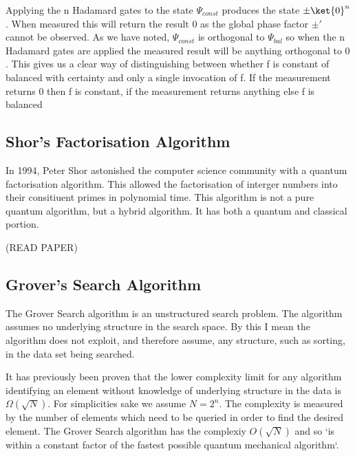\documentclass[authoryearcitations]{UoYCSproject}
\begin{document}
Applying the n Hadamard gates to the state $\Psi_{const}$ produces the state $\pm\ket{0}^n$.
When measured this will return the result $0$ as the global phase factor $\pm'$ cannot be observed.
As we have noted, $\Psi_{const}$ is orthogonal to $\Psi_{bal}$ so when the n Hadamard gates are applied the measured result will be anything orthogonal to $0$.
This gives us a clear way of distinguishing between whether f is constant of balanced with certainty and only a single invocation of f.
If the measurement returns $0$ then f is constant, if the measurement returns anything else f is balanced  

\subsection{Shor's Factorisation Algorithm}
In 1994, Peter Shor astonished the computer science community with a quantum factorisation algorithm.
This allowed the factorisation of interger numbers into their consitiuent primes in polynomial time.
This algorithm is not a pure quantum algorithm, but a hybrid algorithm.
It has both a quantum and classical portion.



(READ PAPER) 

\subsection{Grover's Search Algorithm}	
The Grover Search algorithm\cite{Grover:1996rk} is an unstructured search problem.
The algorithm assumes no underlying structure in the search space.
By this I mean the algorithm does not exploit, and therefore assume, any structure, such as sorting, in the data set being searched.

It has previously been proven\cite{Bennett:1996iu} that the lower complexity limit for any algorithm identifying an element without knowledge of underlying structure in the data is $\Omega(\sqrt{N})$.
For simplicities sake we assume $N=2^n$.
The complexity is measured by the number of elements which need to be queried in order to find the desired element.
The Grover Search algorithm has the complexiy $O(\sqrt{N})$ and so `is within a constant factor of the fastest possible quantum mechanical algorithm`\cite{Grover:1996rk}.
\end{document}
